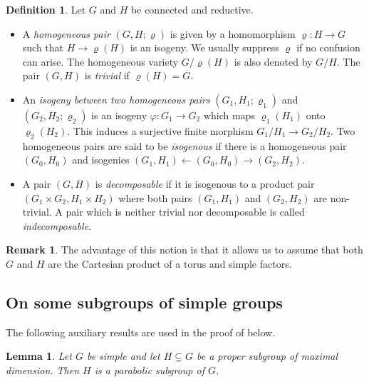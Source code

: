 \documentclass[12pt]{amsart}
\renewcommand{\phi}{\varphi}
\renewcommand{\rho}{\varrho}
\numberwithin{equation}{section}
\newtheorem{lemma}[lemma]{Lemma}
\theoremstyle{definition}
\newtheorem{definition}[definition]{Definition}
\newtheorem{remark}[remark]{Remark}
\begin{document}
\begin{definition}
  \label{def:pairs}
  Let $G$ and $H$ be connected and reductive.
  \begin{itemize}
  	\item [(i)] A \emph{homogeneous pair} $(G,H;\rho)$ is given by a homomorphism $\rho:H\to G$ such that $H\to\rho(H)$ is an isogeny. We usually suppress $\rho$ if no
  	confusion can arise. The homogeneous variety $G/\rho(H)$ is also
  	denoted by $G/H$. The pair $(G,H)$ is \emph{trivial} if
  	$\rho(H)=G$.
  	\item [(ii)] An \emph{isogeny between two homogeneous pairs}
  	$(G_1,H_1;\rho_1)$ and $(G_2,H_2;\rho_2)$ is an isogeny
  	$\phi:G_1\to G_2$ which maps $\rho_1(H_1)$ onto $\rho_2(H_2)$. This
  	induces a surjective finite morphism $G_1/H_1\to G_2/H_2$. Two
  	homogeneous pairs are said to be \emph{isogenous} if there is a
  	homogeneous pair $(G_0,H_0)$ and isogenies
  	$(G_1,H_1)\leftarrow(G_0,H_0)\to(G_2,H_2)$.
  	\item [(iii)] A pair $(G,H)$ is \emph{decomposable} if it is isogenous
  	to a product pair $(G_1\times G_2,H_1\times H_2)$ where both pairs
  	$(G_1,H_1)$ and $(G_2,H_2)$ are non-trivial. A pair which is neither
  	trivial nor decomposable is called \emph{indecomposable}.
  \end{itemize}
\end{definition}

\begin{remark}
  The advantage of this notion is that it allows us to assume that both
  $G$ and $H$ are the Cartesian product of a torus and simple factors.
\end{remark}

\subsection{On some subgroups of simple groups}

The following auxiliary results are used in the proof of 
below.

\begin{lemma}
  \label{lem:diag1}
  Let $G$ be simple and let $H \subsetneq G$ be a proper subgroup of
  maximal dimension. Then $H$ is a parabolic subgroup of $G$.
\end{lemma}
\end{document}
